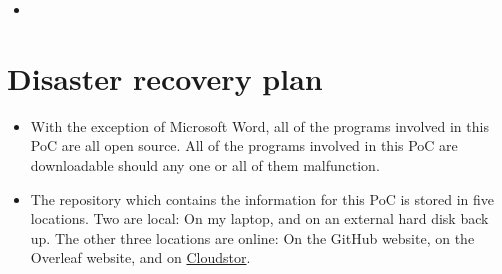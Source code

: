 \documentclass{article}
\begin{document}
\begin{itemize}
    \item 
\end{itemize}

\section{Disaster recovery plan}

\begin{itemize}
    \item With the exception of Microsoft Word, all of the programs involved in this PoC are all open source. All of the programs involved in this PoC are downloadable should any one or all of them malfunction.
    \item The repository which contains the information for this PoC is stored in five locations. Two are local: On my laptop, and on an external hard disk back up. The other three locations are online: On the GitHub website, on the Overleaf website, and on \href{https://cloudstor.aarnet.edu.au/plus/apps/files/?dir=/PoC-2019/Version-Control-Supervisor-Feedback-PoC&fileid=3988737450}{Cloudstor}.
\end{itemize}
\end{document}
